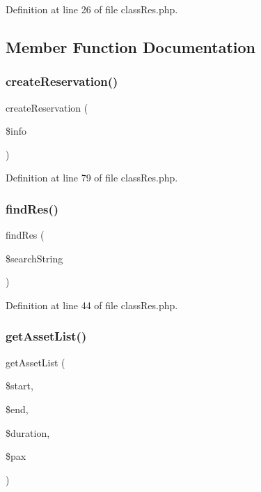 Definition at line 26 of file class\+Res.\+php.



\subsection{Member Function Documentation}
\mbox{\label{classclass_res_a6c5d3040d1db2b9d8000117b5b2539b7}} 
\subsubsection{\texorpdfstring{create\+Reservation()}{createReservation()}}
{\footnotesize\ttfamily create\+Reservation (\begin{DoxyParamCaption}\item[{}]{\$info }\end{DoxyParamCaption})}



Definition at line 79 of file class\+Res.\+php.

\mbox{\label{classclass_res_a8556a92bb6f8fbbdb406cd29e6a6bf9f}} 
\subsubsection{\texorpdfstring{find\+Res()}{findRes()}}
{\footnotesize\ttfamily find\+Res (\begin{DoxyParamCaption}\item[{}]{\$search\+String }\end{DoxyParamCaption})}



Definition at line 44 of file class\+Res.\+php.

\mbox{\label{classclass_res_ae8167da71e306192c7c2b3e4e9780383}} 
\subsubsection{\texorpdfstring{get\+Asset\+List()}{getAssetList()}}
{\footnotesize\ttfamily get\+Asset\+List (\begin{DoxyParamCaption}\item[{}]{\$start,  }\item[{}]{\$end,  }\item[{}]{\$duration,  }\item[{}]{\$pax }\end{DoxyParamCaption})}



